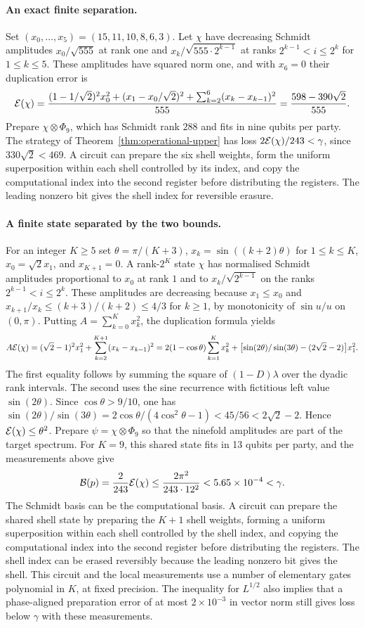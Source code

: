\paragraph{An exact finite separation.}
Set $(x_0,\ldots,x_5)=(15,11,10,8,6,3)$. Let $\chi$ have decreasing
Schmidt amplitudes $x_0/\sqrt{555}$ at rank one and
$x_k/\sqrt{555\cdot2^{k-1}}$ at ranks $2^{k-1}<i\le2^k$ for $1\le k\le5$.
These amplitudes have squared norm one, and with $x_6=0$ their duplication
error is
\[
 \mathcal{E}(\chi)=\frac{(1-1/\sqrt2)^2x_0^2+(x_1-x_0/\sqrt2)^2
                 +\sum_{k=2}^6(x_k-x_{k-1})^2}{555}
          =\frac{598-390\sqrt2}{555}.
\]
Prepare $\chi\otimes\Phi_9$, which has Schmidt rank $288$ and fits in nine
qubits per party. The strategy of Theorem~\ref{thm:operational-upper} has
loss $2\mathcal{E}(\chi)/243<\gamma$, since $330\sqrt2<469$. A circuit can prepare
the six shell weights, form the uniform superposition within each shell
controlled by its index, and copy the computational index into the second
register before distributing the registers. The leading nonzero bit gives
the shell index for reversible erasure.


\paragraph{A finite state separated by the two bounds.}
For an integer $K\ge5$ set $\theta=\pi/(K+3)$, $x_k=\sin((k+2)\theta)$ for $1\le k\le K$, $x_0=\sqrt2 x_1$, and $x_{K+1}=0$. A rank-$2^K$ state $\chi$ has normalised Schmidt amplitudes proportional to $x_0$ at rank $1$ and to $x_k/\sqrt{2^{k-1}}$ on the ranks $2^{k-1}<i\le2^k$. These amplitudes are decreasing because $x_1\le x_0$ and $x_{k+1}/x_k\le(k+3)/(k+2)\le4/3$ for $k\ge1$, by monotonicity of $\sin u/u$ on $(0,\pi)$. Putting $A=\sum_{k=0}^K x_k^2$, the duplication formula yields
\[
 A\mathcal{E}(\chi)=(\sqrt2-1)^2x_1^2+\sum_{k=2}^{K+1}(x_k-x_{k-1})^2
 =2(1-\cos\theta)\sum_{k=1}^Kx_k^2+\bigl[\sin(2\theta)/\sin(3\theta)-(2\sqrt2-2)\bigr]x_1^2.
\]
The first equality follows by summing the square of $(1-D)\lambda$ over the dyadic rank intervals. The second uses the sine recurrence with fictitious left value $\sin(2\theta)$. Since $\cos\theta>9/10$, one has $\sin(2\theta)/\sin(3\theta)=2\cos\theta/(4\cos^2\theta-1)<45/56<2\sqrt2-2$. Hence $\mathcal{E}(\chi)\le\theta^2$. Prepare $\psi=\chi\otimes\Phi_9$ so that the ninefold amplitudes are part of the target spectrum. For $K=9$, this shared state fits in 13 qubits per party, and the measurements above give
\[
 \mathcal B(p)=\frac2{243}\mathcal{E}(\chi)\le\frac{2\pi^2}{243\cdot12^2}<5.65\times10^{-4}<\gamma.
\]
The Schmidt basis can be the computational basis. A circuit can prepare the shared shell state by preparing the $K+1$ shell weights, forming a uniform superposition within each shell controlled by the shell index, and copying the computational index into the second register before distributing the registers. The shell index can be erased reversibly because the leading nonzero bit gives the shell. This circuit and the local measurements use a number of elementary gates polynomial in $K$, at fixed precision.
The inequality for $L^{1/2}$ also implies that a phase-aligned preparation error of at most $2\times10^{-3}$ in vector norm still gives loss below $\gamma$ with these measurements.
